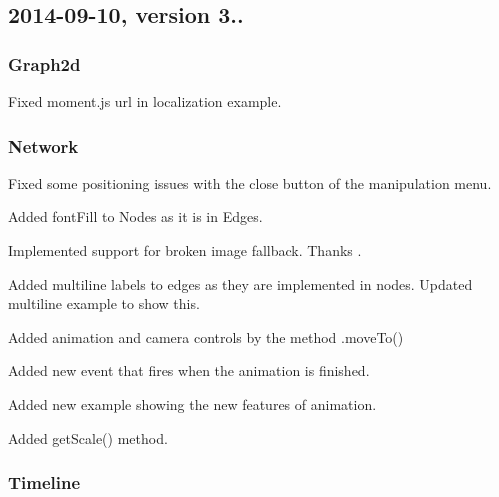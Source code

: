\subsection*{2014-\/09-\/10, version 3..}

\subsubsection*{Graph2d}


\begin{DoxyItemize}
\item Fixed moment.\+js url in localization example.
\end{DoxyItemize}

\subsubsection*{Network}


\begin{DoxyItemize}
\item Fixed some positioning issues with the close button of the manipulation menu.
\item Added font\+Fill to Nodes as it is in Edges.
\item Implemented support for broken image fallback. Thanks .
\item Added multiline labels to edges as they are implemented in nodes. Updated multiline example to show this.
\item Added animation and camera controls by the method .move\+To()
\item Added new event that fires when the animation is finished.
\item Added new example showing the new features of animation.
\item Added get\+Scale() method.
\end{DoxyItemize}

\subsubsection*{Timeline}


